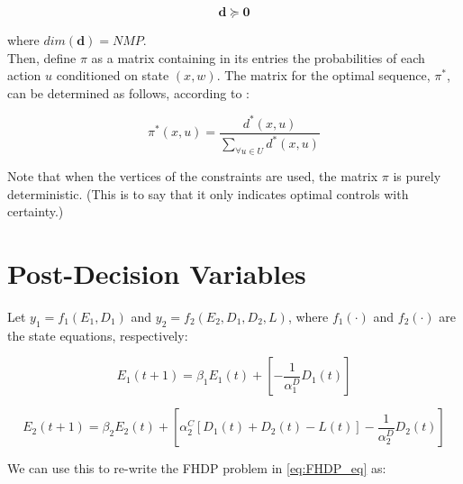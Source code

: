 \documentclass{article}
\begin{document}
	\begin{displaymath} 
	\boldsymbol{d} \succeq \boldsymbol{0}
	\end{displaymath}
	
	where $dim(\boldsymbol{d})=NMP$.\\
	
	Then, define $\pi$ as a matrix containing in its entries the probabilities of each action $u$ conditioned on state $(x,w)$. The matrix for the optimal sequence, $\pi^{*}$, can be determined as follows, according to \cite{4220813}:
	
	\begin{equation}
	\pi^{*}(x,u)=\frac{d^{*}(x,u)}{\sum_{\forall u \in U}d^{*}(x,u)}
	\end{equation}
	
	Note that when the vertices of the constraints are used, the matrix $\pi$ is purely deterministic\cite{MDPs}. (This is to say that it only indicates optimal controls with certainty.)
	
	
	
	
	\section{Post-Decision Variables}
	Let $y_{1}=f_{1}(E_{1},D_{1})$ and $y_{2}=f_{2}(E_{2},D_{1},D_{2},L)$, where $f_{1}(\cdot)$ and $f_{2}(\cdot)$ are the state equations, respectively:
	
	\begin{displaymath}
	E_{1}(t+1)=\beta_{1}E_{1}(t)+\left[-\frac{1}{\alpha_{1}^{D}}D_{1}(t)\right]
	\end{displaymath}
	
	\begin{displaymath}
	E_{2}(t+1)=\beta_{2}E_{2}(t)+\left[\alpha_{2}^{C}[D_{1}(t)+D_{2}(t)-L(t)]-\frac{1}{\alpha_{2}^{D}}D_{2}(t)\right]
	\end{displaymath}
	
	We can use this to re-write the FHDP problem in \eqref{eq:FHDP_eq} as:
	
\end{document}

